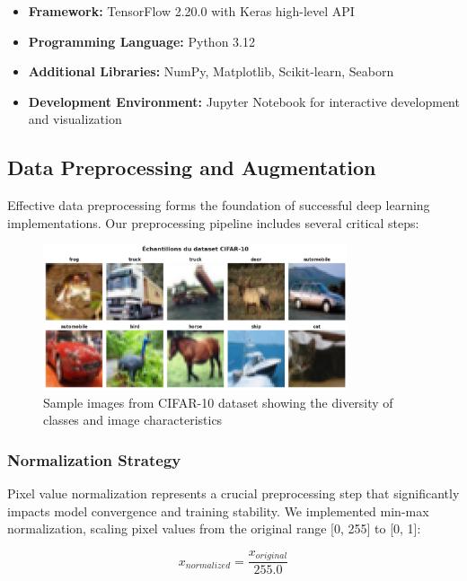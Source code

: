 \documentclass[11pt,a4paper]{article}
\begin{document}
\begin{itemize}
    \item \textbf{Framework:} TensorFlow 2.20.0 with Keras high-level API
    \item \textbf{Programming Language:} Python 3.12
    \item \textbf{Additional Libraries:} NumPy, Matplotlib, Scikit-learn, Seaborn
    \item \textbf{Development Environment:} Jupyter Notebook for interactive development and visualization
\end{itemize}

\subsection{Data Preprocessing and Augmentation}

Effective data preprocessing forms the foundation of successful deep learning implementations. Our preprocessing pipeline includes several critical steps:

\begin{figure}[H]
    \centering
    \includegraphics[width=0.8\textwidth]{tp2_cnn_img/cell_06_output_00_image_01.png}
    \caption{Sample images from CIFAR-10 dataset showing the diversity of classes and image characteristics}
    \label{fig:cifar_samples}
\end{figure}

\subsubsection{Normalization Strategy}

Pixel value normalization represents a crucial preprocessing step that significantly impacts model convergence and training stability. We implemented min-max normalization, scaling pixel values from the original range [0, 255] to [0, 1]:

\begin{equation}
x_{normalized} = \frac{x_{original}}{255.0}
\end{equation}
\end{document}
